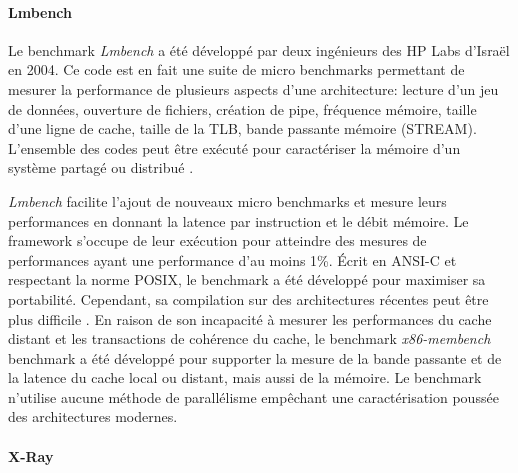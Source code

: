        
        \paragraph{Lmbench \cite{Staelin2004}} 
            
            
            Le benchmark \textit{Lmbench}\cite{Staelin2004} a été développé par deux ingénieurs des HP Labs d'Israël en 2004. Ce code est en fait une suite de micro benchmarks permettant de mesurer la performance de plusieurs aspects d'une architecture: lecture d'un jeu de données, ouverture de fichiers, création de pipe, fréquence mémoire, taille d'une ligne de cache, taille de la TLB, bande passante mémoire (STREAM). L'ensemble des codes peut être exécuté pour caractériser la mémoire d'un système partagé ou distribué \cite{Staelin2002}.
            
            \textit{Lmbench} facilite l'ajout de nouveaux micro benchmarks et mesure leurs performances en donnant la latence par instruction et le débit mémoire. Le framework s'occupe de leur exécution pour atteindre des mesures de performances ayant une performance d'au moins 1\%. Écrit en ANSI-C et respectant la norme POSIX, le benchmark a été développé pour maximiser sa portabilité. Cependant, sa compilation sur des architectures récentes peut être plus difficile \cite{Yotov2004}. En raison de son incapacité à mesurer les performances du cache distant et les transactions de cohérence du cache, le benchmark \textit{x86-membench} benchmark \cite{Molka2017b} a été développé pour supporter la mesure de la bande passante et de la latence du cache local ou distant, mais aussi de la mémoire. Le benchmark n'utilise aucune méthode de parallélisme empêchant une caractérisation poussée des architectures modernes. 

        \paragraph{X-Ray \cite{Yotov2004}} 
        
